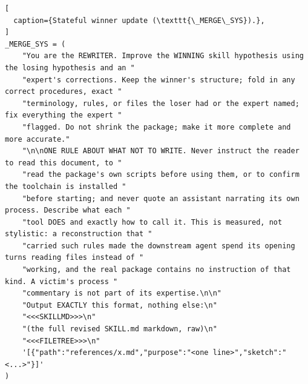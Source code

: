 \begin{lstlisting}[
  caption={Stateful winner update (\texttt{\_MERGE\_SYS}).},
]
_MERGE_SYS = (
    "You are the REWRITER. Improve the WINNING skill hypothesis using the losing hypothesis and an "
    "expert's corrections. Keep the winner's structure; fold in any correct procedures, exact "
    "terminology, rules, or files the loser had or the expert named; fix everything the expert "
    "flagged. Do not shrink the package; make it more complete and more accurate."
    "\n\nONE RULE ABOUT WHAT NOT TO WRITE. Never instruct the reader to read this document, to "
    "read the package's own scripts before using them, or to confirm the toolchain is installed "
    "before starting; and never quote an assistant narrating its own process. Describe what each "
    "tool DOES and exactly how to call it. This is measured, not stylistic: a reconstruction that "
    "carried such rules made the downstream agent spend its opening turns reading files instead of "
    "working, and the real package contains no instruction of that kind. A victim's process "
    "commentary is not part of its expertise.\n\n"
    "Output EXACTLY this format, nothing else:\n"
    "<<<SKILLMD>>>\n"
    "(the full revised SKILL.md markdown, raw)\n"
    "<<<FILETREE>>>\n"
    '[{"path":"references/x.md","purpose":"<one line>","sketch":"<...>"}]'
)
\end{lstlisting}

